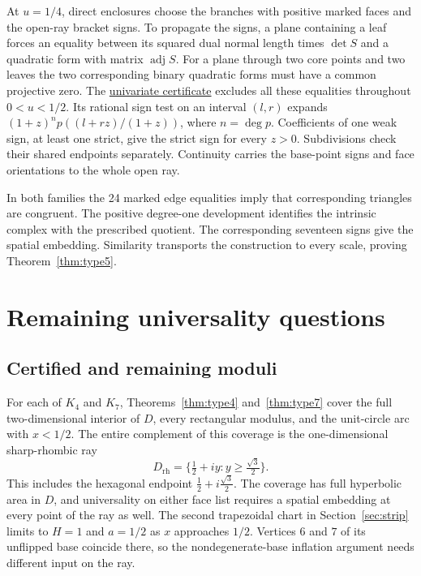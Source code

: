 \documentclass[11pt,letterpaper]{amsart}
\newcommand{\release}{bd3a0e03908481d738df30233cf95c641a1d3f71}
\newcommand{\reporef}[2]{\href{https://github.com/vltanh/lean4-origami-torus/blob/\release/#1}{#2}}
\begin{document}
At \(u=1/4\), direct enclosures choose the branches with positive
marked faces and the open-ray bracket signs. To propagate the signs,
a plane containing a leaf forces an equality between its squared
dual normal length times \(\det S\) and a quadratic form with matrix
\(\operatorname{adj}S\). For a plane through two core points and two
leaves the two corresponding binary quadratic forms must have a
common projective zero. The
\reporef{docs/EightVertex/Type5SharpSigns.md}{univariate certificate}
excludes all these equalities throughout \(0<u<1/2\). Its rational
sign test on an interval \((l,r)\) expands
\((1+z)^n p((l+rz)/(1+z))\), where \(n=\deg p\). Coefficients
of one weak sign, at least one strict, give the strict sign for every
\(z>0\). Subdivisions check their shared endpoints separately.
Continuity carries the base-point signs and face orientations to the
whole open ray.

In both families the 24 marked edge equalities imply that corresponding
triangles are congruent. The positive degree-one development identifies
the intrinsic complex with the prescribed quotient. The corresponding
seventeen signs give the spatial embedding. Similarity transports the
construction to every scale, proving Theorem~\ref{thm:type5}.

\section{Remaining universality questions}\label{sec:remaining}

\subsection*{Certified and remaining moduli}

For each of \(K_4\) and \(K_7\), Theorems~\ref{thm:type4}
and~\ref{thm:type7} cover the full two-dimensional interior of \(D\),
every rectangular modulus, and the unit-circle arc with \(x<1/2\).
The entire complement of this coverage is the
one-dimensional sharp-rhombic ray
\[
 D_{\mathrm{rh}}=\{\tfrac12+iy:y\ge\tfrac{\sqrt3}{2}\}.
\]
This includes the hexagonal endpoint \(\tfrac12+i\tfrac{\sqrt3}{2}\).
The coverage has full hyperbolic area in \(D\), and universality on
either face list requires a spatial embedding at every point of the
ray as well. The second trapezoidal chart in Section~\ref{sec:strip}
limits to \(H=1\) and \(a=1/2\) as \(x\) approaches \(1/2\).
Vertices \(6\) and \(7\) of its unflipped base coincide there, so the
nondegenerate-base inflation argument needs different input on the ray.
\end{document}
